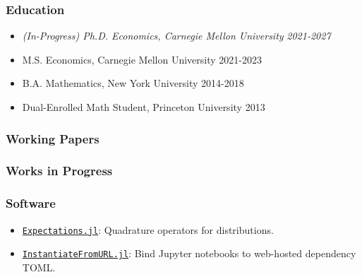 \documentclass[12pt]{article}   %
\begin{document}
\subsubsection*{Education}
\begin{itemize}
  \item \textit{(In-Progress) Ph.D. Economics, Carnegie Mellon University} \hfill \emph{2021-2027}
  \item M.S. Economics, Carnegie Mellon University \hfill 2021-2023
  \item B.A. Mathematics, New York University \hfill 2014-2018
  \item Dual-Enrolled Math Student, Princeton University \hfill 2013
\end{itemize} 


\subsubsection*{Working Papers}
\begin{refsection} %
\nocite{NBERw28981}
\hspace*{1.2cm}%
\begin{minipage}{0.9\textwidth}%
  \printbibliography[heading=none, sorting=ynt]
\end{minipage}%
\end{refsection}

\subsubsection*{Works in Progress}
\begin{refsection} %
\nocite{FP}
\nocite{SL}
\hspace*{1.2cm}%
\begin{minipage}{0.9\textwidth}%
  \printbibliography[heading=none, sorting=ynt]
\end{minipage}%
\end{refsection}


\subsubsection*{Software}
\begin{itemize}
  \item \href{https://github.com/QuantEcon/Expectations.jl}{\texttt{Expectations.jl}}: Quadrature operators for distributions.
  \item \href{https://github.com/QuantEcon/InstantiateFromURL.jl}{\texttt{InstantiateFromURL.jl}}: Bind Jupyter notebooks to web-hosted dependency TOML.
\end{itemize}
\end{document}
